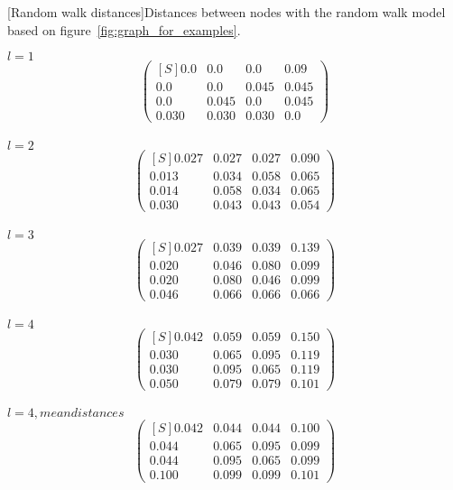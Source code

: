 \newpage
\centering
\normalsize
[Random walk distances]{Distances between nodes with the random walk model based on figure~\ref{fig:graph_for_examples}.}\label{tbl:RW3}
\begin{multicols}{2}
\centering
$l = 1$
\vspace{-.5em}
\[
\begin{pmatrix*}[S]
0.0	& 0.0	& 0.0	& 0.09\\
0.0	& 0.0	& 0.045	& 0.045\\
0.0	& 0.045	& 0.0	& 0.045\\
0.030	& 0.030	& 0.030	& 0.0
\end{pmatrix*}
\]\\

$l = 2$
\vspace{-.5em}
\[
\begin{pmatrix*}[S]
0.027	& 0.027	& 0.027	& 0.090\\
0.013	& 0.034	& 0.058	& 0.065\\
0.014	& 0.058	& 0.034	& 0.065\\
0.030	& 0.043	& 0.043	& 0.054
\end{pmatrix*}
\]\\

$l = 3$
\vspace{-.5em}
\[
\begin{pmatrix*}[S]
0.027	& 0.039	& 0.039	& 0.139\\
0.020	& 0.046	& 0.080	& 0.099\\
0.020	& 0.080	& 0.046	& 0.099\\
0.046	& 0.066	& 0.066	& 0.066
\end{pmatrix*}
\]\\

$l = 4$
\vspace{-.5em}
\[
\begin{pmatrix*}[S]
0.042	& 0.059	& 0.059	& 0.150\\
0.030	& 0.065	& 0.095	& 0.119\\
0.030	& 0.095	& 0.065	& 0.119\\
0.050	& 0.079	& 0.079	& 0.101
\end{pmatrix*}
\]\\

$l = 4, mean distances$
\vspace{-.5em}
\[
\begin{pmatrix*}[S]
0.042	& 0.044	& 0.044	& 0.100\\
0.044	& 0.065	& 0.095	& 0.099\\
0.044	& 0.095	& 0.065	& 0.099\\
0.100	& 0.099	& 0.099	& 0.101
\end{pmatrix*}
\]\\

\phantom{
$\begin{pmatrix*}[S]
0.042	& 0.044	& 0.044	& 0.100\\
0.044	& 0.065	& 0.095	& 0.099\\
0.044	& 0.095	& 0.065	& 0.099\\
0.100	& 0.099	& 0.099	& 0.101
\end{pmatrix*}$}
\end{multicols}
